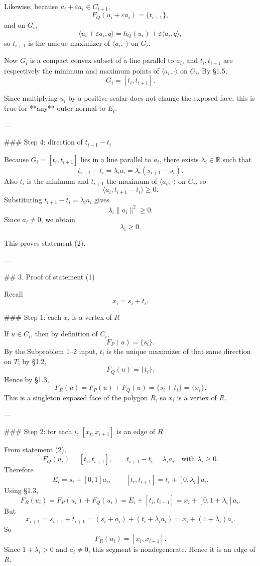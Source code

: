 Likewise, because \(u_i+\varepsilon a_i\in C_{i+1}\),
\[
F_Q(u_i+\varepsilon a_i)=\{t_{i+1}\},
\]
and on \(G_i\),
\[
\langle u_i+\varepsilon a_i,q\rangle=h_Q(u_i)+\varepsilon\langle a_i,q\rangle,
\]
so \(t_{i+1}\) is the unique maximizer of \(\langle a_i,\cdot\rangle\) on \(G_i\).

Now \(G_i\) is a compact convex subset of a line parallel to \(a_i\), and \(t_i,t_{i+1}\) are respectively the minimum and maximum points of \(\langle a_i,\cdot\rangle\) on \(G_i\). By §1.5,
\[
G_i=[t_i,t_{i+1}].
\]

Since multiplying \(u_i\) by a positive scalar does not change the exposed face, this is true for **any** outer normal to \(E_i\).

---

### Step 4: direction of \(t_{i+1}-t_i\)

Because \(G_i=[t_i,t_{i+1}]\) lies in a line parallel to \(a_i\), there exists \(\lambda_i\in\mathbb R\) such that
\[
t_{i+1}-t_i=\lambda_i a_i=\lambda_i(s_{i+1}-s_i).
\]
Also \(t_i\) is the minimum and \(t_{i+1}\) the maximum of \(\langle a_i,\cdot\rangle\) on \(G_i\), so
\[
\langle a_i,t_{i+1}-t_i\rangle\ge 0.
\]
Substituting \(t_{i+1}-t_i=\lambda_i a_i\) gives
\[
\lambda_i\|a_i\|^2\ge 0.
\]
Since \(a_i\neq 0\), we obtain
\[
\lambda_i\ge 0.
\]

This proves statement (2).

---

## 3. Proof of statement (1)

Recall
\[
x_i=s_i+t_i.
\]

### Step 1: each \(x_i\) is a vertex of \(R\)

If \(u\in C_i\), then by definition of \(C_i\),
\[
F_P(u)=\{s_i\}.
\]
By the Subproblem 1–2 input, \(t_i\) is the unique maximizer of that same direction on \(T\); by §1.2,
\[
F_Q(u)=\{t_i\}.
\]
Hence by §1.3,
\[
F_R(u)=F_P(u)+F_Q(u)=\{s_i+t_i\}=\{x_i\}.
\]
This is a singleton exposed face of the polygon \(R\), so \(x_i\) is a vertex of \(R\).

---

### Step 2: for each \(i\), \([x_i,x_{i+1}]\) is an edge of \(R\)

From statement (2),
\[
F_Q(u_i)=[t_i,t_{i+1}],
\qquad
t_{i+1}-t_i=\lambda_i a_i
\quad\text{with }\lambda_i\ge 0.
\]
Therefore
\[
E_i=s_i+[0,1]a_i,
\qquad
[t_i,t_{i+1}]=t_i+[0,\lambda_i]a_i.
\]
Using §1.3,
\[
F_R(u_i)=F_P(u_i)+F_Q(u_i)=E_i+[t_i,t_{i+1}]
= x_i+[0,1+\lambda_i]a_i.
\]
But
\[
x_{i+1}
=s_{i+1}+t_{i+1}
=(s_i+a_i)+(t_i+\lambda_i a_i)
=x_i+(1+\lambda_i)a_i.
\]
So
\[
F_R(u_i)=[x_i,x_{i+1}].
\]
Since \(1+\lambda_i>0\) and \(a_i\neq 0\), this segment is nondegenerate. Hence it is an edge of \(R\).


